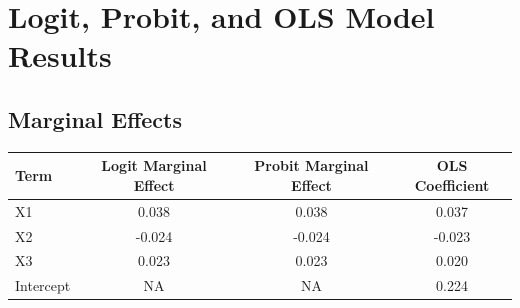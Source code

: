 \documentclass{article}
\begin{document}
\section*{Logit, Probit, and OLS Model Results}
\subsection*{Marginal Effects}
\begin{tabular}{lccc}
\toprule
Term & Logit Marginal Effect & Probit Marginal Effect & OLS Coefficient \\
\midrule
X1 & 0.038 & 0.038 & 0.037 \\
X2 & -0.024 & -0.024 & -0.023 \\
X3 & 0.023 & 0.023 & 0.020 \\
Intercept &   NA &   NA & 0.224 \\
\bottomrule
\end{tabular}
\end{document}
